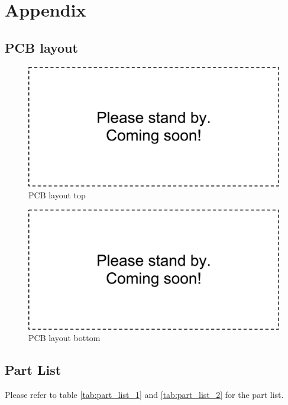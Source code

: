 \chapter{Appendix}

\section{PCB layout}
\begin{figure}[Htb]
\includegraphics[width=\columnwidth]{Images/dummy}
\caption{PCB layout top}
\label{fig:pcb_layout_top}
\end{figure}

\begin{figure}[Htb]
\includegraphics[width=\columnwidth]{Images/dummy}
\caption{PCB layout bottom}
\label{fig:pcb_layout_bottom}
\end{figure}
\clearpage


\section{Part List}
\label{sec:part_list}
Please refer to table \ref{tab:part_list_1} and \ref{tab:part_list_2} for the part list. 

